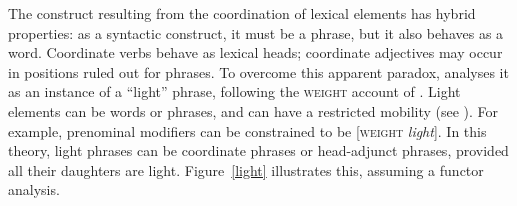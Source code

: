 {The construct resulting from the coordination of lexical elements has hybrid properties: as a syntactic construct, it must be a phrase, but it also behaves as a word. Coordinate verbs behave as lexical heads; coordinate adjectives may occur in positions ruled out for phrases. To overcome this apparent paradox, \citet[Section~5.1]{Abeille:06} analyses it as an instance of a ``light'' phrase, following the \textsc{weight} account of \citet{Abeille:Godard:2000, Abeille:Godard:2004}. Light elements can be words or phrases, and can have a restricted mobility (see ). For example, prenominal modifiers can be constrained to be [\textsc{weight} \emph{light}]. In this theory, light phrases can be coordinate phrases or head-adjunct phrases, provided all their daughters are light. Figure~\ref{light} illustrates this, assuming a functor analysis.

}

